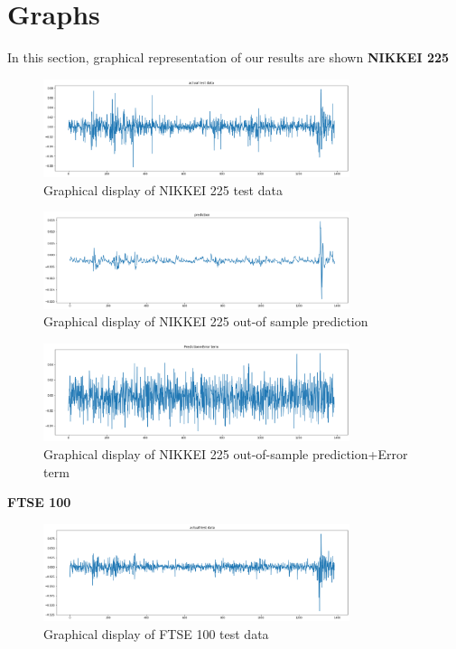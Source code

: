 \documentclass[a4paper,11pt,oneside]{book}
\begin{document}
\section{Graphs}
In this section, graphical representation of our results are shown \newline\newline
\textbf{NIKKEI 225}
\begin{figure}[!h]
	\centering
	\includegraphics[width=0.8\textwidth]{figures/NIKKEITEST}
	\caption{Graphical display of NIKKEI 225 test data}
	\label{NIKKEITEST}
\end{figure}
\begin{figure}[!h]
	\centering
	\includegraphics[width=0.8\textwidth]{figures/NIKKEIPRED}
	\caption{Graphical display of NIKKEI 225 out-of sample prediction}
	\label{NIKKEIPRED}
\end{figure}

\begin{figure}[!h]
	\centering
	\includegraphics[width=0.8\textwidth]{figures/NIKKEIERROR}
	\caption{Graphical display of NIKKEI 225 out-of-sample prediction+Error term}
	\label{NIKKEIERROR}
\end{figure}
\newpage
\vfill


\textbf{FTSE 100}
\begin{figure}[!h]
	\centering
	\includegraphics[width=0.8\textwidth]{figures/FTSETEST}
	\caption{Graphical display of FTSE 100 test data}
	\label{FTSETEST}
\end{figure}
\end{document}
